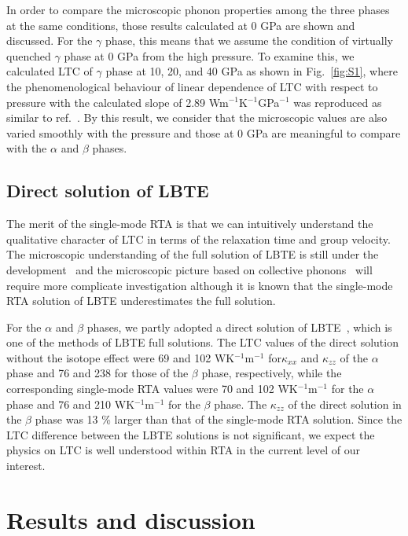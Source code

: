 \documentclass[twocolumn,amsmath,amssymb,a4paper,prb,superscriptaddress,floatfix]{revtex4-1}
\begin{document}
In order to compare the microscopic phonon properties among the three phases at
the same conditions, those results calculated at 0 GPa are shown and discussed.
For the $\gamma$ phase, this means that we assume the condition of virtually
quenched $\gamma$ phase at 0 GPa from the high pressure. To examine this, we
calculated LTC of $\gamma$ phase at 10, 20, and 40 GPa as shown in
Fig.~\ref{fig:S1}, where the phenomenological behaviour of linear dependence of
LTC with respect to pressure with the calculated slope of 2.89
Wm$^{-1}$K$^{-1}$GPa$^{-1}$ was reproduced as similar to
ref.~. By this result, we consider that the
microscopic values are also varied smoothly with the pressure and those at 0
GPa are meaningful to compare with the $\alpha$ and $\beta$ phases.

\subsection{Direct solution of LBTE}
The merit of the single-mode RTA is that we can intuitively understand the
qualitative character of LTC in terms of the relaxation time and group
velocity. The microscopic understanding of the full solution of LBTE is still
under the development~\cite{cepellotti-relaxons} and the microscopic picture
based on collective phonons~\cite{hardy-collective} will require more
complicate investigation although it is known that the single-mode RTA solution
of LBTE underestimates the full solution.~\cite{mukhopadhyay-ltc,ward-ltc}


For the $\alpha$ and $\beta$ phases, we partly adopted a direct solution of
LBTE~\cite{chaput-direct}, which is one of the methods of LBTE full solutions.
The LTC values of the direct solution without the isotope effect were  69 and
102 WK$^{-1}$m$^{-1}$ for$\kappa_{xx}$ and $\kappa_{zz}$  of the $\alpha$ phase
and 76 and 238 for those of the $\beta$ phase, respectively, while the
corresponding single-mode RTA values were 70 and 102 WK$^{-1}$m$^{-1}$ for the
$\alpha$ phase and 76 and 210 WK$^{-1}$m$^{-1}$ for the $\beta$ phase. The
$\kappa_{zz}$ of the direct solution in the $\beta$ phase was 13 \% larger than
that of the single-mode RTA solution. Since the LTC difference between the LBTE
solutions is not significant, we expect the physics on LTC is well
understood within RTA in the current level of our interest.

\section{Results and discussion}
\end{document}
